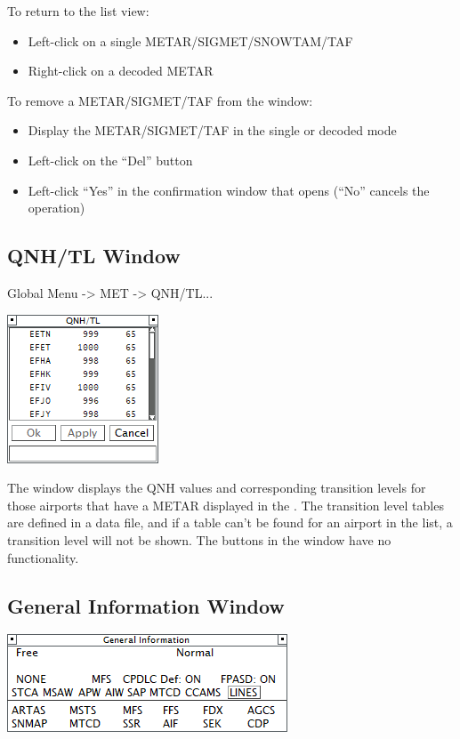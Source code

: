 \documentclass[11pt,a4paper]{memoir}
\begin{document}
To return to the list view:

\begin{itemize}
    \item Left-click on a single METAR/SIGMET/SNOWTAM/TAF
    \item Right-click on a decoded METAR
\end{itemize}

To remove a METAR/SIGMET/TAF from the window:

\begin{itemize}
    \item Display the METAR/SIGMET/TAF in the single or decoded mode
    \item Left-click on the “Del” button
    \item Left-click “Yes” in the confirmation window that opens (“No” cancels the operation)
\end{itemize}

\subsection{QNH/TL Window}
\label{win:qnhtl}

Global Menu -> MET -> QNH/TL...

\includegraphics{img/qnhtl.png}

The window displays the QNH values and corresponding transition levels for those airports that have a METAR displayed in the \textit{}. The transition level tables are defined in a data file, and if a table can’t be found for an airport in the list, a transition level will not be shown. The buttons in the window have no functionality.

\subsection{General Information Window}
\label{win:geninfo}

\includegraphics{img/geninfo.png}
\end{document}
